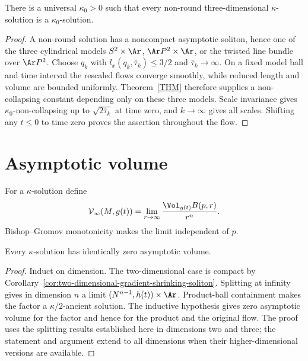 \begin{proposition}\label{prop:universal-kappa-non-round}
\label{kappa0}
There is a universal $\kappa_0>0$ such that every non-round
three-dimensional $\kappa$-solution is a $\kappa_0$-solution.
\end{proposition}
\begin{proof}
\sketch
{}
A non-round solution has a noncompact asymptotic soliton, hence one
of the three cylindrical models $S^2\times\Ar$,
$\Ar P^2\times\Ar$, or the twisted line bundle over $\Ar P^2$.
Choose $q_k$ with $l_x(q_k,\bar\tau_k)\leq3/2$ and
$\bar\tau_k\to\infty$. On a fixed model ball and time interval the
rescaled flows converge smoothly, while reduced length and volume
are bounded uniformly. Theorem~\ref{THM} therefore supplies a
non-collapsing constant depending only on these three models. Scale
invariance gives $\kappa_0$-non-collapsing up to
$\sqrt{2\bar\tau_k}$ at time zero, and $k\to\infty$ gives all
scales. Shifting any $t\leq0$ to time zero proves the assertion
throughout the flow.
\end{proof}

\section{Asymptotic volume}

For a $\kappa$-solution define
\[
 \mathcal V_\infty(M,g(t))
 =\lim_{r\to\infty}\frac{\Vol_{g(t)}B(p,r)}{r^n}.
\]
Bishop--Gromov monotonicity makes the limit independent of $p$.

\begin{theorem}\label{thm:asymptotic-volume-zero}
\label{asympvol}
Every $\kappa$-solution has identically zero asymptotic volume.
\end{theorem}
\begin{proof}
\sketch
{}
Induct on dimension. The two-dimensional case is compact by
Corollary~\ref{cor:two-dimensional-gradient-shrinking-soliton}.
Splitting at infinity gives in dimension $n$ a limit
$(N^{n-1},h(t))\times\Ar$. Product-ball containment makes the
factor a $\kappa/2$-ancient solution. The inductive hypothesis gives
zero asymptotic volume for the factor and hence for the product and
the original flow. The proof uses the splitting results established
here in dimensions two and three; the statement and argument extend
to all dimensions when their higher-dimensional versions are
available.
\end{proof}

